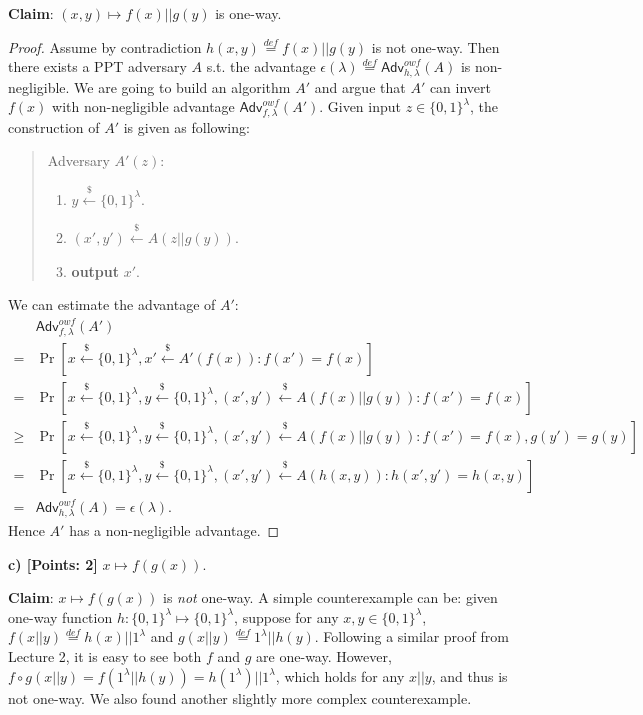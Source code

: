 \documentclass[12pt]{article}
\newcommand{\eqdef}{\stackrel{def}{=}}
\newcommand{\bits}{\{0,1\}}
\newcommand{\getsr}{\stackrel{\$}{\gets}}
\newcommand{\Adv}{\textsf{Adv}}
\theoremstyle{definition}
\begin{document}
{\bf Claim}: $(x, y) \mapsto f(x) || g(y)$ is one-way.
\begin{proof}
Assume by contradiction $h(x, y) \eqdef f(x) || g(y)$ is not one-way. Then there exists a PPT adversary $A$ s.t. the advantage $\epsilon(\lambda) \eqdef \Adv_{h,\lambda}^{owf}(A)$ is non-negligible. We are going to build an algorithm $A'$ and argue that $A'$ can invert $f(x)$ with non-negligible advantage $\Adv_{f,\lambda}^{owf}(A')$. Given input $z \in\bits^{\lambda}$, the construction of $A'$ is given as following:
\begin{quote}
Adversary $A' (z)$:
\begin{enumerate}
\item $y \getsr \bits^\lambda$.
\item $(x', y') \getsr A(z || g(y))$.
\item {\bf output} $x'$.
\end{enumerate}
\end{quote}
We can estimate the advantage of $A'$:
$$
\begin{aligned}
& \Adv_{f,\lambda}^{owf}(A') \\
=& \Pr[x\getsr \bits^\lambda, x' \getsr A'(f(x)) : f(x')=f(x)] \\
=& \Pr[x\getsr \bits^\lambda, y\getsr \bits^\lambda, (x', y') \getsr A(f(x) || g(y)) : f(x')=f(x)] \\
\geq & \Pr[x\getsr \bits^\lambda, y\getsr \bits^\lambda, (x', y') \getsr A(f(x) || g(y)) : f(x')=f(x), g(y')=g(y)] \\
=& \Pr[x\getsr \bits^\lambda, y\getsr \bits^\lambda, (x', y') \getsr A(h(x, y)) : h(x', y')=h(x, y)] \\
=& \Adv_{h,\lambda}^{owf}(A) = \epsilon(\lambda).
\end{aligned}
$$
Hence $A'$ has a non-negligible advantage.
\end{proof}

{\bf c) [Points: 2]} $x \mapsto f(g(x))$.

{\bf Claim}: $x \mapsto f(g(x))$ is \emph{not} one-way. A simple counterexample can be: given one-way function $h : \bits^\lambda \mapsto \bits^\lambda$, suppose for any $x,y \in \bits^\lambda$, $f(x||y) \eqdef h(x)||1^\lambda$ and $g(x||y) \eqdef 1^\lambda || h(y)$. Following a similar proof from Lecture 2, it is easy to see both $f$ and $g$ are one-way. However, $f \circ g (x||y) = f(1^\lambda||h(y)) = h(1^\lambda)||1^\lambda$, which holds for any $x||y$, and thus is not one-way. We also found another slightly more complex counterexample.
\end{document}
